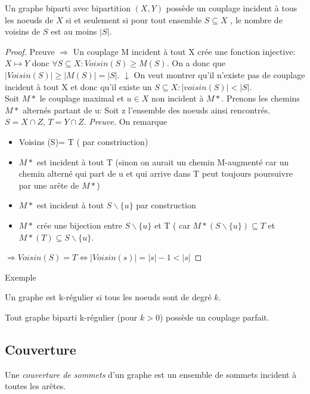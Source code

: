 \begin{mytheo} 
  Un graphe biparti avec bipartition $(X , Y)$ possède un couplage incident à tous les noeuds de $X$ si et seulement si pour tout ensemble $S \subseteq X$ , le nombre de voisins de $S$ est au moins $|S|$.
  \begin{proof}
     Preuve $\Longrightarrow$ Un couplage M incident à tout X crée une fonction injective: $X\mapsto Y$ donc $\forall S \subseteq X: Voisin (S) \geq M(S) $. On a donc que $ |Voisin (S)| \geq |M(S)| = |S| $.
     $\downarrow$ On veut montrer qu'il n'existe pas de couplage incident à tout X et donc qu'il existe un $ S \subseteq X: |voisin (S)| < |S|$. \\
     Soit $M*$ le couplage maximal et $ u \in X$ non incident à $M*$. Prenons les chemins $M*$ alternés partant de u: Soit z l'ensemble des noeuds ainsi rencontrés. $ S = X\cap Z$, $T= Y \cap Z$.
     \textit{Preuve.} On remarque \begin{itemize}
     \item Voisins (S)= T ( par constriuction)
     \item	$M*$ est incident à tout T (sinon on aurait un chemin M-augmenté car un chemin alterné qui part de u et qui arrive dans T peut toujours poursuivre par une arête de $M*$)
     \item $M*$ est incident à tout $S\backslash\lbrace u\rbrace$ par construction
     \item $M*$ crée une bijection entre $S\backslash\lbrace u\rbrace$ et T ( car $M* (S\backslash\lbrace u\rbrace) \subseteq T$ et $M*(T) \subseteq S\backslash\lbrace u\rbrace$.
     \end{itemize}
     $ \Rightarrow  Voisin (S)= T \Longleftrightarrow  |Voisin(s)| = |s|-1 < |s|$

  \end{proof}
\end{mytheo}
\begin{myexem}
  Exemple \addTODO
\end{myexem}

\begin{myrem}
  Un graphe est k-régulier si tous les noeuds sont de degré $k$.
\end{myrem}

\begin{mycorr}
  Tout graphe biparti k-régulier (pour $k > 0$) possède un couplage parfait.
\end{mycorr}

\subsection{Couverture}
\begin{mydef}
  Une \emph{couverture de sommets} d’un graphe est un ensemble de sommets incident à toutes les arêtes.
\end{mydef}

